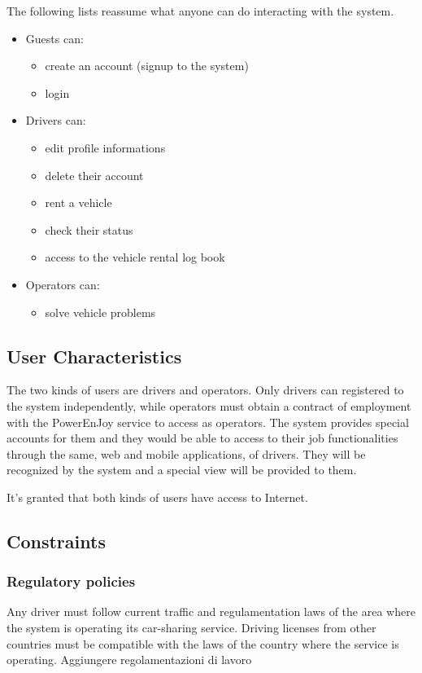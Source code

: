 The following lists reassume what anyone can do interacting with the system.
\begin{itemize}
	\item Guests can:
	\begin{itemize}
		\item create an account (signup to the system)
		\item login
	\end{itemize}
	\item Drivers can:
	\begin{itemize}
		\item edit profile informations
		\item delete their account
		\item rent a vehicle
		\item check their status
		\item access to the vehicle rental log book
	\end{itemize}
	\item Operators can:
	\begin{itemize}
		\item solve vehicle problems
	\end{itemize}
\end{itemize}

\subsection{User Characteristics}
The two kinds of users are drivers and operators. Only drivers can registered to the system independently, while operators must obtain a contract of employment with the PowerEnJoy service to access as operators. The system provides special accounts for them and they would be able to access to their job functionalities through the same, web and mobile applications, of drivers. They will be recognized by the system and a special view will be provided to them.

It's granted that both kinds of users have access to Internet.

\subsection{Constraints}

\subsubsection{Regulatory policies}
Any driver must follow current traffic and regulamentation laws of the area where the system is operating its car-sharing service. Driving licenses from other countries must be compatible with the laws of the country where the service is operating.
Aggiungere regolamentazioni di lavoro

